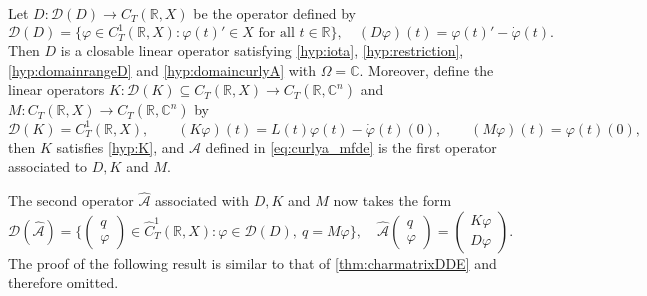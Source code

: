 \documentclass[english]{myarticle}
\begin{document}
\begin{sloppypar}
\begin{lemma}
Let $D : \mathcal{D}(D) \to C_T(\mathbb{R},X)$ be the operator defined by
\begin{equation*}
    \mathcal{D}(D) = \{ \varphi \in C_T^1(\mathbb{R},X) : \varphi(t)' \in X \mbox{ for all $t \in \mathbb{R}$} \}, \quad (D\varphi)(t) = \varphi(t)' - \dot{\varphi}(t).
\end{equation*}
Then $D$ is a closable linear operator satisfying \ref{hyp:iota}, \ref{hyp:restriction}, \ref{hyp:domainrangeD} and \ref{hyp:domaincurlyA} with $\Omega = \mathbb{C}$. Moreover, define the linear operators $K : \mathcal{D}(K) \subseteq C_T(\mathbb{R},X) \to C_T(\mathbb{R},\mathbb{C}^n)$ and $M : C_T(\mathbb{R},X) \to C_T(\mathbb{R},\mathbb{C}^n)$ by
\begin{equation*}
    \mathcal{D}(K) = C_T^1(\mathbb{R},X), \qquad (K\varphi)(t) = L(t) \varphi(t) - \dot{\varphi}(t)(0), \qquad (M\varphi)(t) = \varphi(t)(0), 
\end{equation*}
then $K$ satisfies \ref{hyp:K}, and $\mathcal{A}$ defined in \eqref{eq:curlya_mfde} is the first operator associated to $D, K$ and $M$.
\end{lemma}
The second operator $\hat{\mathcal{A}}$ associated with $D, K$ and $M$ now takes the form 
\begin{equation*}
    \mathcal{D}(\hat{\mathcal{A}}) = \bigg \{ \begin{pmatrix}
    q\\
    \varphi
    \end{pmatrix}
    \in \hat{C}_T^1(\mathbb{R},X) : \varphi \in \mathcal{D}(D), \ q = M\varphi \bigg \}, \quad 
    \hat{\mathcal{A}}
    \begin{pmatrix}
    q\\
    \varphi
    \end{pmatrix}
    =
    \begin{pmatrix}
    K\varphi \\
    D\varphi
    \end{pmatrix}.
\end{equation*}
The proof of the following result is similar to that of \cref{thm:charmatrixDDE} and therefore omitted.


\end{sloppypar}
\end{document}
